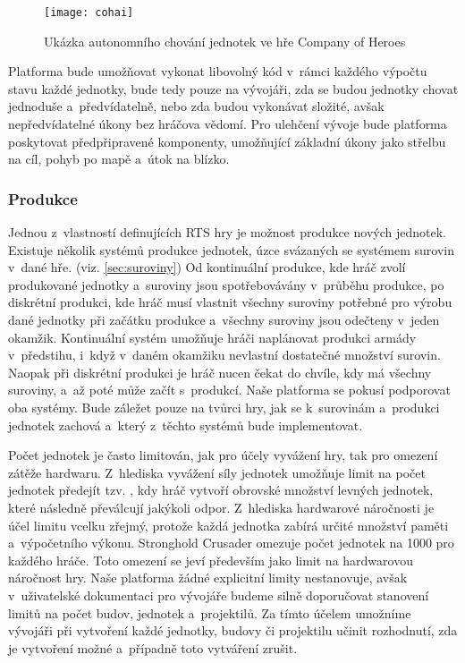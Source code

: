 \begin{figure}[h]	
	\centering
	\texttt{[image: cohai]}
	\caption{Ukázka autonomního chování jednotek ve hře Company of Heroes \citep{site:COH}}
	\label{fig:cohai}
\end{figure}

Platforma bude umožňovat vykonat libovolný kód v~rámci každého výpočtu stavu každé jednotky, bude tedy pouze na vývojáři, zda se budou jednotky chovat jednoduše a~předvídatelně, nebo zda budou vykonávat složité, avšak nepředvídatelné úkony bez hráčova vědomí. Pro ulehčení vývoje bude platforma poskytovat předpřipravené komponenty, umožňující základní úkony jako střelbu na cíl, pohyb po mapě a~útok na blízko.

\subsubsection{Produkce}

Jednou z~vlastností definujících RTS hry je možnost produkce nových jednotek. Existuje několik systémů produkce jednotek, úzce svázaných se systémem surovin v~dané hře. (viz. \ref{sec:suroviny})  Od kontinuální produkce, kde hráč zvolí produkované jednotky a~suroviny jsou spotřebovávány v~průběhu produkce, po diskrétní produkci, kde hráč musí vlastnit všechny suroviny potřebné pro výrobu dané jednotky při začátku produkce a~všechny suroviny jsou odečteny v~jeden okamžik. Kontinuální systém umožňuje hráči naplánovat produkci armády v~předstihu, i~když v~daném okamžiku nevlastní dostatečné množství surovin. Naopak při diskrétní produkci je hráč nucen čekat do chvíle, kdy má všechny suroviny, a~až poté může začít s~produkcí. Naše platforma se pokusí podporovat oba systémy. Bude záležet pouze na tvůrci hry, jak se k~surovinám a~produkci jednotek zachová a~který z~těchto systémů bude implementovat.

Počet jednotek je často limitován, jak pro účely vyvážení hry, tak pro omezení zátěže hardwaru. Z~hlediska vyvážení síly jednotek umožňuje limit na počet jednotek předejít tzv. , kdy hráč vytvoří obrovské množství levných jednotek, které následně převálcují jakýkoli odpor. Z~hlediska hardwarové náročnosti je účel limitu vcelku zřejmý, protože každá jednotka zabírá určité množství paměti a~výpočetního výkonu. Stronghold Crusader omezuje počet jednotek na 1000 pro každého hráče. Toto omezení se jeví především jako limit na hardwarovou náročnost hry. Naše platforma žádné explicitní limity nestanovuje, avšak v~uživatelské dokumentaci pro vývojáře budeme silně doporučovat stanovení limitů na počet budov, jednotek a~projektilů. Za tímto účelem umožníme vývojáři při vytvoření každé jednotky, budovy či projektilu učinit rozhodnutí, zda je vytvoření možné a~případně toto vytváření zrušit. 

